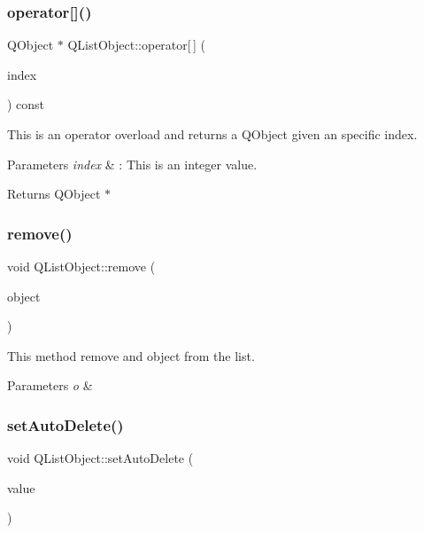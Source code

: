 \subsubsection{\texorpdfstring{operator[]()}{operator[]()}}
{\footnotesize\ttfamily Q\+Object $\ast$ Q\+List\+Object\+::operator\mbox{[}$\,$\mbox{]} (\begin{DoxyParamCaption}\item[{int}]{index }\end{DoxyParamCaption}) const}



This is an operator overload and returns a Q\+Object given an specific index. 


\begin{DoxyParams}{Parameters}
{\em index} & \+: This is an integer value. \\
\hline
\end{DoxyParams}
\begin{DoxyReturn}{Returns}
Q\+Object $\ast$ 
\end{DoxyReturn}
\mbox{\label{class_q_list_object_af6bc1883142f976bfd3e82c9d0c030bb}} 
\subsubsection{\texorpdfstring{remove()}{remove()}}
{\footnotesize\ttfamily void Q\+List\+Object\+::remove (\begin{DoxyParamCaption}\item[{Q\+Object $\ast$}]{object }\end{DoxyParamCaption})}



This method remove and object from the list. 


\begin{DoxyParams}{Parameters}
{\em o} & \\
\hline
\end{DoxyParams}
\mbox{\label{class_q_list_object_a6c30632fb46f8f7d404f77a9fea49bee}} 
\subsubsection{\texorpdfstring{set\+Auto\+Delete()}{setAutoDelete()}}
{\footnotesize\ttfamily void Q\+List\+Object\+::set\+Auto\+Delete (\begin{DoxyParamCaption}\item[{bool}]{value }\end{DoxyParamCaption})}



